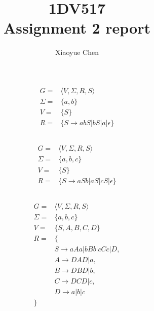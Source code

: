 \documentclass{article}
\author{Xiaoyue Chen}
\title{1DV517\\Assignment 2 report}
\begin{document}
\maketitle

\section{}
\subsection{}
\begin{align*}
	G =      & \langle V, \Sigma, R, S \rangle             \\
	\Sigma = & \{ a, b \}                                  \\
	V =      & \{ S \}                                     \\
	R =      & \{ S \rightarrow abS | bS | a | \epsilon \}
\end{align*}

\subsection{}
\begin{align*}
	G =      & \langle V, \Sigma, R, S \rangle              \\
	\Sigma = & \{ a, b, c \}                                \\
	V =      & \{ S \}                                      \\
	R =      & \{ S \rightarrow aSb | aS | cS | \epsilon \}
\end{align*}

\subsection{}
\begin{align*}
	G =      & \langle V, \Sigma, R, S \rangle    \\
	\Sigma = & \{ a, b, c \}                      \\
	V =      & \{ S, A, B, C, D \}                \\
	R =      & \{                                 \\
	         & S \rightarrow aAa | bBb | cCc | D, \\
	         & A \rightarrow DAD | a,             \\
	         & B \rightarrow DBD | b,             \\
	         & C \rightarrow DCD | c,             \\
	         & D \rightarrow a | b | c            \\
	\}
\end{align*}
\end{document}
